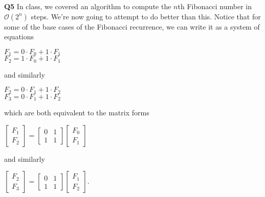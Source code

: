 \documentclass[12pt]{article}
\newcommand{\question}[3][Q]{
\begin{description}
\item \textbf{#1{#2}} #3
\end{description}
}
\newcommand{\bigO}{\mathcal{O}}
\begin{document}
\question{5}{
    In class, we covered an algorithm to compute the $n$th Fibonacci number in $\bigO(2^n)$ steps. We're now going to attempt to do better than this. Notice that for some of the base cases of the Fibonacci recurrence, we can write it as a system of equations
    \begin{center}
    \begin{minipage}{0.25\textwidth}
    $F_1 = 0 \cdot F_0 + 1 \cdot F_1$\\
    $F_2 = 1 \cdot F_0 + 1 \cdot F_1$
    \end{minipage}
    \begin{minipage}{0.25\textwidth}
    \centering
    and similarly
    \end{minipage}
    \begin{minipage}{0.25\textwidth}
    $F_2 = 0 \cdot F_1 + 1 \cdot F_2$\\
    $F_3 = 0 \cdot F_1 + 1 \cdot F_2$
    \end{minipage}
    \end{center}

    which are both equivalent to the matrix forms


    \begin{center}
    \begin{minipage}{0.25\textwidth}
    $\begin{bmatrix}F_1 \\ F_2\end{bmatrix} = \begin{bmatrix}
        0 & 1 \\ 1 & 1
    \end{bmatrix}\begin{bmatrix}F_0 \\ F_1\end{bmatrix}$
    \end{minipage}
    \begin{minipage}{0.25\textwidth}
    \centering
    and similarly
    \end{minipage}
    \begin{minipage}{0.25\textwidth}
    $\begin{bmatrix}F_2 \\ F_3\end{bmatrix} = \begin{bmatrix}
        0 & 1 \\ 1 & 1
    \end{bmatrix}\begin{bmatrix}F_1 \\ F_2\end{bmatrix}.$
    \end{minipage}
    \end{center}

}
\end{document}
